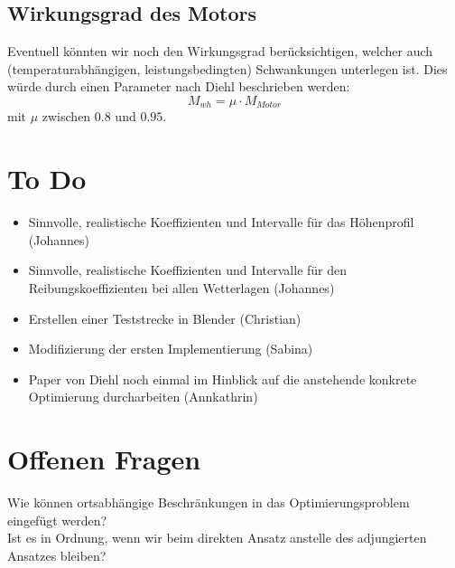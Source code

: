 \documentclass[12pt,a4paper]{article}
\theoremstyle{definition}
\theoremstyle{plain}
\begin{document}
\subsection{Wirkungsgrad des Motors}
Eventuell könnten wir noch den Wirkungsgrad berücksichtigen, welcher auch (temperaturabhängigen, leistungsbedingten) Schwankungen unterlegen ist. Dies würde durch einen Parameter nach Diehl beschrieben werden:
$$ M_{wh}=\mu\cdot M_{Motor} $$
mit $\mu$ zwischen $0.8$ und $0.95$.

\section{To Do}
\begin{itemize}
\item Sinnvolle, realistische Koeffizienten und Intervalle für das Höhenprofil (Johannes)

\item Sinnvolle, realistische Koeffizienten und Intervalle für den Reibungskoeffizienten bei allen Wetterlagen (Johannes)

\item Erstellen einer Teststrecke in Blender (Christian)

\item Modifizierung der ersten Implementierung (Sabina)

\item Paper von Diehl noch einmal im Hinblick auf die anstehende konkrete Optimierung durcharbeiten (Annkathrin)
\end{itemize}

\section{Offenen Fragen}
Wie können ortsabhängige Beschränkungen in das Optimierungsproblem eingefügt werden?\\
Ist es in Ordnung, wenn wir beim direkten Ansatz anstelle des adjungierten Ansatzes bleiben?
\end{document}
